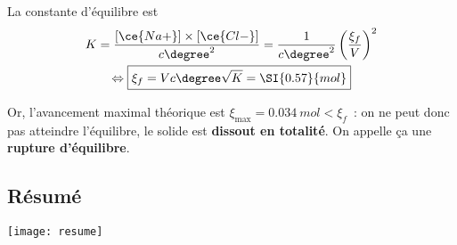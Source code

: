 \documentclass[../main/main.tex]{subfiles}
\begin{document}
La constante d'équilibre est
\begin{gather*}
    K = \frac{[\ce{Na+}]\times[\ce{Cl-}]}{c\degree^2}
      = \frac{1}{c\degree^2} \left(\frac{\xi_f}{V}\right)^2\\
    \Leftrightarrow
    \boxed{\xi_f = Vc\degree\sqrt{K} = \SI{0.57}{mol}}
\end{gather*}

Or, l'avancement maximal théorique est $\xi_{\max} = \SI{0.034}{mol} < \xi_f$~:
on ne peut donc pas atteindre l'équilibre, le solide est \textbf{dissout en
totalité}. On appelle ça une \textbf{rupture d'équilibre}.

\subsection{Résumé}

\begin{center}
    \texttt{[image: resume]}
\end{center}
\end{document}

